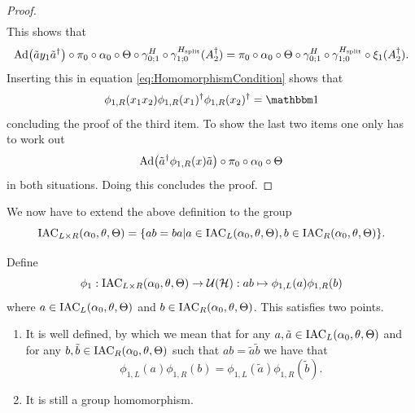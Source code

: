 \documentclass[12pt,a4paper,twoside]{article}
\numberwithin{equation}{section}
\begin{document}
\begin{proof}
\begin{align}
	\end{align}
	This shows that
	\begin{equation}
		\Ad{\tilde{a}y_1\tilde{a}^\dagger}\circ\pi_0\circ\alpha_0\circ\Theta\circ\gamma^H_{0;1}\circ\gamma^{H_\text{split}}_{1;0}(A_2^\dagger)=\pi_0\circ\alpha_0\circ\Theta\circ\gamma^H_{0;1}\circ\gamma^{H_\text{split}}_{1;0}\circ\xi_1(A_2^\dagger).
	\end{equation}
	Inserting this in equation \eqref{eq:HomomorphismCondition} shows that
	\begin{equation}
		\phi_{1,R}(x_1x_2)\phi_{1,R}(x_1)^\dagger\phi_{1,R}(x_2)^\dagger=\id
	\end{equation}
	concluding the proof of the third item. To show the last two items one only has to work out
	\begin{equation}
		\Ad{\tilde{a}^\dagger \phi_{1,R}(x)\tilde{a}}\circ\pi_0\circ\alpha_0\circ\Theta
	\end{equation}
	in both situations. Doing this concludes the proof.
\end{proof}
We now have to extend the above definition to the group
\begin{equation}
	\textrm{IAC}_{L\times R}(\alpha_0,\theta,\Theta)=\{ab=ba|a\in\textrm{IAC}_{L}(\alpha_0,\theta,\Theta),b\in\textrm{IAC}_{R}(\alpha_0,\theta,\Theta)\}.
\end{equation}
\begin{lemma}\label{lem:extensionOfPhi1Definition}
	Define
	\begin{equation}
		\phi_1:\textrm{IAC}_{L\times R}(\alpha_0,\theta,\Theta)\rightarrow\mathcal U(\mathcal H):ab\mapsto \phi_{1,L}(a)\phi_{1,R}(b)
	\end{equation}
	where $a\in \textrm{IAC}_{L}(\alpha_0,\theta,\Theta)$ and $b\in \textrm{IAC}_{R}(\alpha_0,\theta,\Theta)$. This satisfies two points.
	\begin{enumerate}
		\item It is well defined, by which we mean that for any $a,\tilde{a}\in \textrm{IAC}_{L}(\alpha_0,\theta,\Theta)$ and for any $b,\tilde{b}\in \textrm{IAC}_{R}(\alpha_0,\theta,\Theta)$ such that $ab=\tilde{a}\tilde{b}$ we have that
		\begin{equation}
			\phi_{1,L}(a)\phi_{1,R}(b)=\phi_{1,L}(\tilde a)\phi_{1,R}(\tilde b).
		\end{equation}
		\item It is still a group homomorphism.
	\end{enumerate}
\end{lemma}
\end{document}
